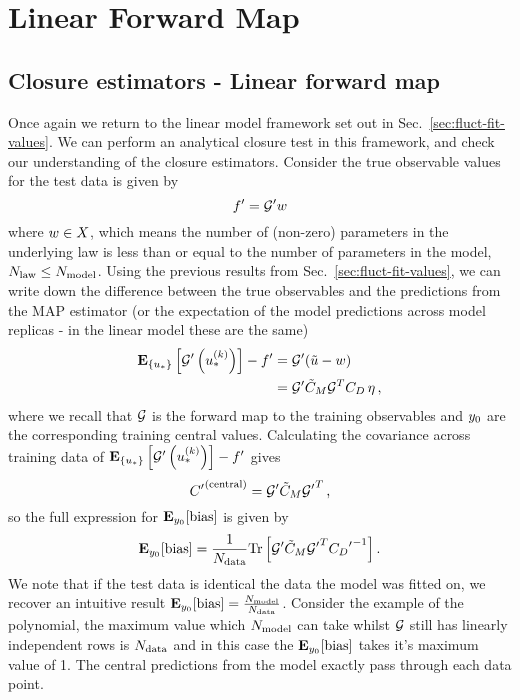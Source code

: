 \section{Linear Forward Map}

\subsection{Closure estimators - Linear forward map}
\label{Sec:LinearMapEstimators}

Once again we return to the linear model framework set out in
Sec.~\ref{sec:fluct-fit-values}. We can perform an analytical closure
test in this framework, and check our
understanding of the closure estimators. Consider the true observable
values for the test data is given by
\begin{equation}\label{eq:LinearLawMap}
    {{f}^{\prime}} = {{\mathcal{G}}^{\prime}} w
\end{equation}
where $w \in X$, which means the number of (non-zero) parameters
in the underlying law is less than or equal to the number of parameters in the
model, $N_{\rm law} \leq N_{\rm model}$. Using the previous results from
Sec.~\ref{sec:fluct-fit-values}, we can write down the
difference between the true observables and the predictions from the MAP estimator
(or the expectation of the model predictions across model replicas - in the
linear model these are the same)
\begin{equation}
    \begin{split}
        \mathbf{E}_{\{ u_* \}} \left[ {{\mathcal{G}}^{\prime}}\left(u_*^{(k)}\right) \right] - {{f}^{\prime}} &=
        {{\mathcal{G}}^{\prime}} (\tilde{u} - w ) \\
        &= {{\mathcal{G}}^{\prime}} \tilde{C}_M \mathcal{G}^T C_{D} \, \eta \, ,
    \end{split}
\end{equation}
where we recall that $\mathcal{G}$ is the forward map to the training observables
and $y_0$ are
the corresponding training central values. Calculating the covariance across
training data of
$\mathbf{E}_{\{ u_* \}} \left[ {{\mathcal{G}}^{\prime}}\left(u_*^{(k)}\right) \right] - {{f}^{\prime}}$
gives
\begin{equation}
    {{C}^{\prime}}^{(\rm central)} = {{\mathcal{G}}^{\prime}} \tilde{C}_M {{\mathcal{G}}^{\prime}}^T \, ,
\end{equation}
so the full expression for $\mathbf{E}_{y_0}[{\rm bias}]$ is given by
\begin{equation}\label{eq:BiasLinearModel}
    \mathbf{E}_{y_0}[{\rm bias}] = \frac{1}{N_{\rm data}}
    {\rm Tr} \left[
        {{\mathcal{G}}^{\prime}} \tilde{C}_M {{\mathcal{G}}^{\prime}}^T
        {{C_{D}}^{\prime}}^{-1}
    \right].
\end{equation}
We note that if the test data is identical the data the model was fitted on,
we recover an intuitive result $\mathbf{E}_{y_0}[{\rm bias}] = \frac{N_{\rm model}}{N_{\rm data}}$.
Consider the example of the polynomial, the maximum value which $N_{\rm model}$ can
take whilst $\mathcal{G}$ still has linearly independent rows is $N_{\rm data}$ and in this case
the $\mathbf{E}_{y_0}[{\rm bias}]$ takes it's maximum value of 1. The central
predictions from the model exactly pass through each data point.

